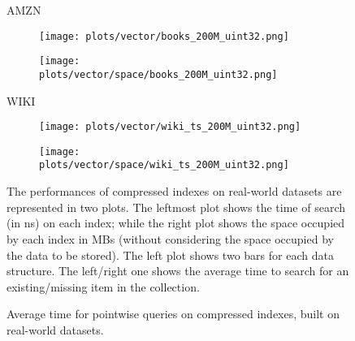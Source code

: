 \documentclass{article}
\begin{document}
\begin{figure}[!htbp]
{\begin{minipage}[t][0.98\textheight][t]{\textwidth}
    \begin{minipage}{0.03\linewidth}
    \begin{sideways}\small AMZN\end{sideways}
    \end{minipage}
    \begin{minipage}{0.3\linewidth}
        \begin{figure}[H]
        \texttt{[image: plots/vector/books\_200M\_uint32.png]}
        \end{figure}
    \end{minipage}
    \begin{minipage}{0.3\linewidth}
        \begin{figure}[H]
            \texttt{[image: plots/vector/space/books\_200M\_uint32.png]}
        \end{figure}
    \end{minipage}
    \vspace*{-20px}

    \begin{minipage}{0.03\linewidth}
    \begin{sideways}\small WIKI\end{sideways}
    \end{minipage}
    \begin{minipage}{0.3\linewidth}
        \begin{figure}[H]
        \texttt{[image: plots/vector/wiki\_ts\_200M\_uint32.png]}
        \end{figure}
    \end{minipage}
    \begin{minipage}{0.3\linewidth}
        \begin{figure}[H]
            \texttt{[image: plots/vector/space/wiki\_ts\_200M\_uint32.png]}
        \end{figure}
    \end{minipage}

    \vspace*{10px}
    \centering
    \begin{minipage}{\linewidth}
The performances of compressed indexes on real-world datasets are represented in two plots. The leftmost plot shows the time of search (in ns) on each index; while the right plot shows the space occupied by each index in MBs (without considering the space occupied by the data to be stored). The left plot shows two bars for each data structure. The left/right one shows the average time to search for an existing/missing item in the collection.
    \end{minipage}
    \vfill
\end{minipage}
}
\caption{Average time for pointwise queries on compressed indexes, built on real-world datasets.}
\end{figure}
\end{document}

